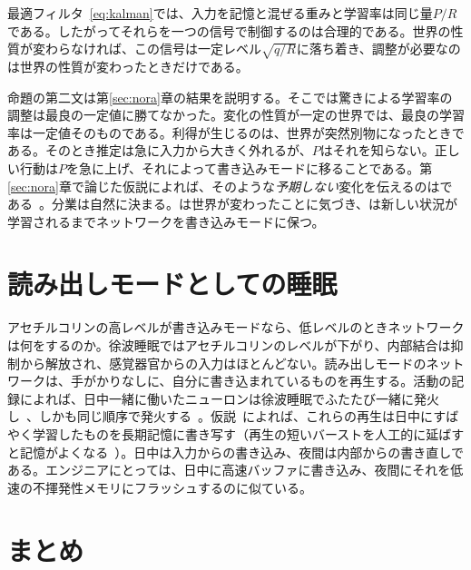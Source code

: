 \begin{keyblock}
\begin{proposition}[入力の重みと学習率に一つのつまみ]
\label{prop:kalman}
最適フィルタ~\eqref{eq:kalman}では、入力を記憶と混ぜる重みと学習率は同じ量$P/R$である。したがってそれらを一つの信号で制御するのは合理的である。世界の性質が変わらなければ、この信号は一定レベル$\sqrt{q/R}$に落ち着き、調整が必要なのは世界の性質が変わったときだけである。
\end{proposition}
\end{keyblock}

命題の第二文は第\ref{sec:nora}章の結果を説明する。そこでは驚きによる学習率の調整は最良の一定値に勝てなかった。変化の性質が一定の世界では、最良の学習率は一定値そのものである。利得が生じるのは、世界が突然別物になったときである。そのとき推定は急に入力から大きく外れるが、$P$はそれを知らない。正しい行動は$P$を急に上げ、それによって書き込みモードに移ることである。第\ref{sec:nora}章で論じた仮説によれば、そのような\emph{予期しない}変化を伝えるのはである~\cite{YuDayan2005}。分業は自然に決まる。は世界が変わったことに気づき、は新しい状況が学習されるまでネットワークを書き込みモードに保つ。

\section{読み出しモードとしての睡眠}

アセチルコリンの高レベルが書き込みモードなら、低レベルのときネットワークは何をするのか。徐波睡眠ではアセチルコリンのレベルが下がり、内部結合は抑制から解放され、感覚器官からの入力はほとんどない。読み出しモードのネットワークは、手がかりなしに、自分に書き込まれているものを再生する。活動の記録によれば、日中一緒に働いたニューロンは徐波睡眠でふたたび一緒に発火し~\cite{WilsonMcNaughton1994}、しかも同じ順序で発火する~\cite{Skaggs1996}。仮説~\cite{Hasselmo1999}によれば、これらの再生は日中にすばやく学習したものを長期記憶に書き写す（再生の短いバーストを人工的に延ばすと記憶がよくなる~\cite{FernandezRuiz2019}）。日中は入力からの書き込み、夜間は内部からの書き直しである。エンジニアにとっては、日中に高速バッファに書き込み、夜間にそれを低速の不揮発性メモリにフラッシュするのに似ている。

\section{まとめ}

